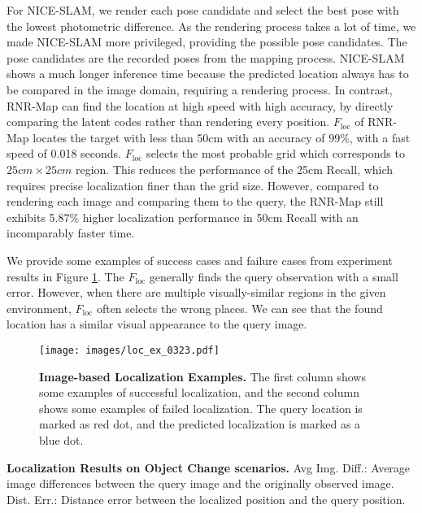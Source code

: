\documentclass[10pt,twocolumn,letterpaper]{article}
\def\proposed{RNR-Map\xspace}
\begin{document}
For NICE-SLAM, we render each pose candidate and select the best pose with the lowest photometric difference.
%
As the rendering process takes a lot of time, we made NICE-SLAM more privileged, providing the possible pose candidates.
%
The pose candidates are the recorded poses from the mapping process.
%
NICE-SLAM shows a much longer inference time because the predicted location always has to be compared in the image domain, requiring a rendering process.
%
%
In contrast, \proposed can find the location at high speed with high accuracy, by directly comparing the latent codes rather than rendering every position.
%
$F_\mathrm{loc}$ of RNR-Map locates the target with less than 50cm with an accuracy of 99\%, with a fast speed of 0.018 seconds.
%
$F_\mathrm{loc}$ selects the most probable grid which corresponds to $25cm \times 25cm$ region. 
%
This reduces the performance of the 25cm Recall, which requires precise localization finer than the grid size.
%
However, compared to rendering each image and comparing them to the query, the \proposed still exhibits 5.87\% higher localization performance in 50cm Recall with an incomparably faster time.

We provide some examples of success cases and failure cases from experiment results in Figure \ref{fig:supp:loc_examples}.
%
The $F_\mathrm{loc}$ generally finds the query observation with a small error. 
%
However, when there are multiple visually-similar regions in the given environment, $F_\mathrm{loc}$ often selects the wrong places. 
%
We can see that the found location has a similar visual appearance to the query image. 
\begin{figure}[t]
  \centering
  \texttt{[image: images/loc\_ex\_0323.pdf]}
  \caption{\textbf{Image-based Localization Examples.} The first column shows some examples of successful localization, and the second column shows some examples of failed localization. The query location is marked as red dot, and the predicted localization is marked as a blue dot.}
\label{fig:supp:loc_examples}
\end{figure}


\begin{table}[t]
\centering
\resizebox{0.8\linewidth}{!}{

}
\caption{\textbf{Localization Results on Object Change scenarios.} Avg Img. Diff.: Average image differences between the query image and the originally observed image. Dist. Err.: Distance error between the localized position and the query position. }\label{tab:ec_loc}
\end{table}
\end{document}
